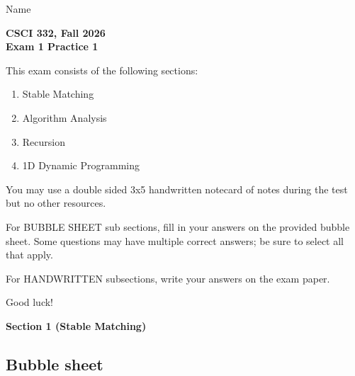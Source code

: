 \documentclass[11pt]{article}
\begin{document}
\noindent Name \underline{\hspace{12cm}}\\

\begin{center}
\Large\textbf{CSCI 332, Fall 2026}\\
\LARGE\textbf{Exam 1 Practice 1}
\end{center}

\noindent This exam consists of the following sections:
\begin{enumerate}
    \item Stable Matching
    \item Algorithm Analysis
    \item Recursion
    \item 1D Dynamic Programming
\end{enumerate}

You may use a double sided 3x5 handwritten notecard of notes during the test but no other resources.

For BUBBLE SHEET sub sections, fill in your answers on the provided bubble sheet. Some questions may have
multiple correct answers; be sure to select all that apply.

For HANDWRITTEN subsections, write your answers on the exam paper.

Good luck!

\newpage

\begin{center}
\LARGE\textbf{Section 1 (Stable Matching)\\}%
\end{center}
\subsection*{Bubble sheet}
\end{document}
